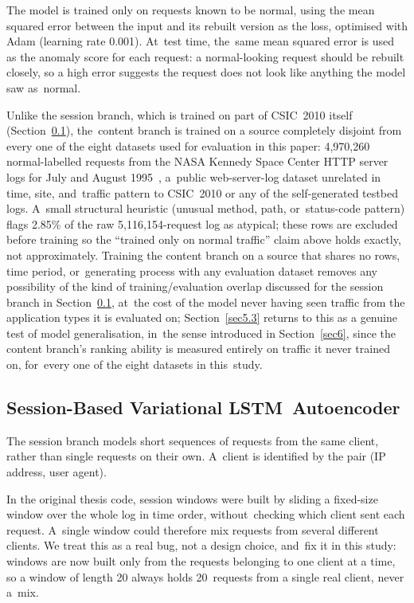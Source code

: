 \documentclass[futureinternet,article,accept,moreauthors]{Definitions/mdpi}
\begin{document}
The model is trained only on requests known to be normal, using the mean squared error between the input and its rebuilt version as the loss, optimised with Adam (learning rate 0.001). At~test time, the~same mean squared error is used as the anomaly score for each request: a normal-looking request should be rebuilt closely, so a high error suggests the request does not look like anything the model saw as~normal.

Unlike the session branch, which is trained on part of CSIC~2010 itself (Section~\ref{sec4.5}), the~content branch is trained on a source completely disjoint from every one of the eight datasets used for evaluation in this paper: 4,970,260 normal-labelled requests from the NASA Kennedy Space Center HTTP server logs for July and August 1995~\cite{arlitt1996}, a~public web-server-log dataset unrelated in time, site, and~traffic pattern to CSIC~2010 or any of the self-generated testbed logs. A~small structural heuristic (unusual method, path, or~status-code pattern) flags 2.85\% of the raw 5,116,154-request log as atypical; these rows are excluded before training so the ``trained only on normal traffic'' claim above holds exactly, not approximately. Training the content branch on a source that shares no rows, time period, or~generating process with any evaluation dataset removes any possibility of the kind of training/evaluation overlap discussed for the session branch in Section~\ref{sec4.5}, at~the cost of the model never having seen traffic from the application types it is evaluated on; Section~\ref{sec5.3} returns to this as a genuine test of model generalisation, in~the sense introduced in Section~\ref{sec6}, since the content branch's ranking ability is measured entirely on traffic it never trained on, for~every one of the eight datasets in this~study.

\subsection{Session-Based Variational LSTM~Autoencoder} \label{sec4.5}

The session branch models short sequences of requests from the same client, rather than single requests on their own. A~client is identified by the pair (IP address, user agent).

In the original thesis code, session windows were built by sliding a fixed-size window over the whole log in time order, without~checking which client sent each request. A~single window could therefore mix requests from several different clients. We treat this as a real bug, not a design choice, and~fix it in this study: windows are now built only from the requests belonging to one client at a time, so a window of length 20 always holds \mbox{20 requests} from a single real client, never a~mix.
\end{document}
